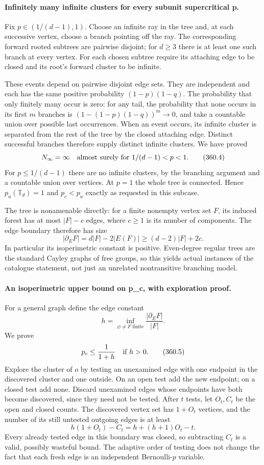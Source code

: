 \documentclass[11pt]{article}
\begin{document}
\paragraph{Infinitely many infinite clusters for every subunit supercritical p.}
Fix $p\in(1/(d-1),1)$. Choose an infinite ray in the tree and,
at each successive vertex, choose a branch pointing off the ray.
The corresponding forward rooted subtrees are pairwise disjoint;
for $d\geq3$ there is at least one such branch at every vertex.
For each chosen subtree require its attaching edge to be closed
and its root's forward cluster to be infinite.

These events depend on pairwise disjoint edge sets. They are
independent and each has the same positive probability
$(1-p)(1-q)$. The probability that only finitely many occur is
zero: for any tail, the probability that none occurs in its first
$m$ branches is $(1-(1-p)(1-q))^m\to0$, and take a countable union
over possible last occurrences. When an event occurs, its infinite
cluster is separated from the rest of the tree by the closed
attaching edge. Distinct successful branches therefore supply
distinct infinite clusters. We have proved
\[
 N_\infty=\infty\quad\hbox{almost surely for }
          1/(d-1)<p<1.
 \tag{360.4}
\]
For $p\leq1/(d-1)$ there are no infinite clusters, by the branching
argument and a countable union over vertices. At $p=1$ the whole
tree is connected. Hence $p_u(\mathbb T_d)=1$ and
$p_c<p_u$ exactly as requested in this subcase.

The tree is nonamenable directly: for a finite nonempty vertex set
$F$, its induced forest has at most $|F|-c$ edges, where $c\geq1$
is its number of components. The edge boundary therefore has size
\[
 |\partial_EF|=d|F|-2|E(F)|\geq(d-2)|F|+2c.
\]
In particular its isoperimetric constant is positive. Even-degree
regular trees are the standard Cayley graphs of free groups, so
this yields actual instances of the catalogue statement, not just
an unrelated nontransitive branching model.

\paragraph{An isoperimetric upper bound on p_c, with exploration proof.}
For a general graph define the edge constant
\[
 h=\inf_{\varnothing\ne F\text{ finite}}
                         \frac{|\partial_EF|}{|F|}.
\]
We prove
\[
 p_c\leq\frac1{1+h}\quad\hbox{if }h>0.
 \tag{360.5}
\]
Explore the cluster of $o$ by testing an unexamined edge with one
endpoint in the discovered cluster and one outside. On an open
test add the new endpoint; on a closed test add none. Discard
unexamined edges whose endpoints have both become discovered,
since they need not be tested. After $t$ tests, let $O_t,C_t$ be
the open and closed counts. The discovered vertex set has
$1+O_t$ vertices, and the number of its still untested outgoing
edges is at least
\[
 h(1+O_t)-C_t=h+(h+1)O_t-t.
 \tag{360.6}
\]
Every already tested edge in this boundary was closed, so subtracting
$C_t$ is a valid, possibly wasteful bound. The adaptive order of
testing does not change the fact that each fresh edge is an
independent Bernoulli-$p$ variable.
\end{document}
